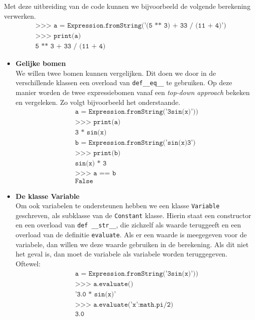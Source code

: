 \documentclass[12pt]{article}
\begin{document}
\vspace{1pc}
Met deze uitbreiding van de code kunnen we bijvoorbeeld de volgende berekening verwerken.
\begin{align*}
& \texttt{>>> a = Expression.fromString('(5 ** 3) + 33 / (11 + 4)')}\\
& \texttt{>>> print(a)}\\
& \texttt{5 ** 3 + 33 / (11 + 4)}
\end{align*} \vspace{0.5pc}
\begin{itemize}
\item \textbf{Gelijke bomen} \\
We willen twee bomen kunnen vergelijken. Dit doen we door in de verschillende klassen een overload van \texttt{def\_\_eq\_\_} te gebruiken. Op deze manier worden de twee expressiebomen vanaf een \textit{top-down approach} bekeken en vergeleken. Zo volgt bijvoorbeeld het onderstaande.
\begin{align*}
&\texttt{a = Expression.fromString('3sin(x)'))}\\
&\texttt{>>> print(a)}\\
&\texttt{3 * sin(x)}\\
&\texttt{b = Expression.fromString('sin(x)3')}\\
&\texttt{>>> print(b)}\\
&\texttt{sin(x) * 3}\\
&\texttt{>>> a == b}\\
&\texttt{False}
\end{align*}


\item \textbf{De klasse Variable} \\
Om ook variabelen te ondersteunen hebben we een klasse \texttt{Variable} geschreven, als subklasse van de \texttt{Constant} klasse. Hierin staat een constructor en een overload van  \texttt{def \_\_str\_\_}, die zichzelf als waarde teruggeeft en een overload van de definitie \texttt{evaluate}. Als er een waarde is meegegeven voor de variabele, dan willen we deze waarde gebruiken in de berekening. Als dit niet het geval is, dan moet de variabele als variabele worden teruggegeven. Oftewel:
\begin{align*}
&\texttt{a = Expression.fromString('3sin(x)'))}\\
&\texttt{>>> a.evaluate()}\\
&\texttt{'3.0 * sin(x)'}\\
&\texttt{>>> a.evaluate({'x':math.pi/2})}\\
&\texttt{3.0}\\
\end{align*}


\end{itemize}
\end{document}
